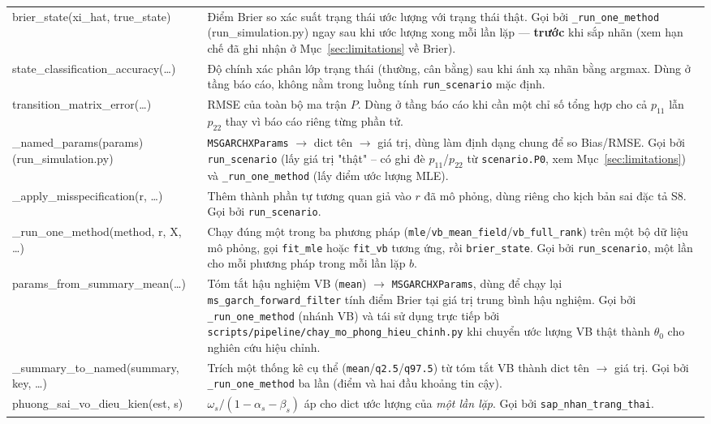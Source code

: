 \documentclass[11pt,a4paper]{article}
\newcommand{\code}[1]{\texttt{#1}}
\begin{document}
\begin{longtable}{@{}>{\ttfamily\scriptsize\raggedright\arraybackslash}p{5.0cm} >{\raggedright\arraybackslash}p{9.5cm}@{}}
brier\_state(xi\_hat, true\_state) & Điểm Brier so xác suất trạng thái ước lượng với trạng thái thật. Gọi bởi \code{\_run\_one\_method} (run\_simulation.py) ngay sau khi ước lượng xong mỗi lần lặp --- \textbf{trước} khi sắp nhãn (xem hạn chế đã ghi nhận ở Mục~\ref{sec:limitations} về Brier). \\
state\_classification\_accuracy(\ldots) & Độ chính xác phân lớp trạng thái (thường, cân bằng) sau khi ánh xạ nhãn bằng argmax. Dùng ở tầng báo cáo, không nằm trong luồng tính \code{run\_scenario} mặc định. \\
transition\_matrix\_error(\ldots) & RMSE của toàn bộ ma trận $P$. Dùng ở tầng báo cáo khi cần một chỉ số tổng hợp cho cả $p_{11}$ lẫn $p_{22}$ thay vì báo cáo riêng từng phần tử. \\
\_named\_params(params) \newline \footnotesize{(run\_simulation.py)} & \code{MSGARCHXParams} $\to$ dict tên $\to$ giá trị, dùng làm định dạng chung để so Bias/RMSE. Gọi bởi \code{run\_scenario} (lấy giá trị "thật" -- có ghi đè $p_{11}$/$p_{22}$ từ \code{scenario.P0}, xem Mục~\ref{sec:limitations}) và \code{\_run\_one\_method} (lấy điểm ước lượng MLE). \\
\_apply\_misspecification(r, \ldots) & Thêm thành phần tự tương quan giả vào $r$ đã mô phỏng, dùng riêng cho kịch bản sai đặc tả S8. Gọi bởi \code{run\_scenario}. \\
\_run\_one\_method(method, r, X, \ldots) & Chạy đúng một trong ba phương pháp (\code{mle}/\code{vb\_mean\_field}/\code{vb\_full\_rank}) trên một bộ dữ liệu mô phỏng, gọi \code{fit\_mle} hoặc \code{fit\_vb} tương ứng, rồi \code{brier\_state}. Gọi bởi \code{run\_scenario}, một lần cho mỗi phương pháp trong mỗi lần lặp $b$. \\
params\_from\_summary\_mean(\ldots) & Tóm tắt hậu nghiệm VB (\code{mean}) $\to$ \code{MSGARCHXParams}, dùng để chạy lại \code{ms\_garch\_forward\_filter} tính điểm Brier tại giá trị trung bình hậu nghiệm. Gọi bởi \code{\_run\_one\_method} (nhánh VB) và tái sử dụng trực tiếp bởi \code{scripts/pipeline/chay\_mo\_phong\_hieu\_chinh.py} khi chuyển ước lượng VB thật thành $\theta_0$ cho nghiên cứu hiệu chỉnh. \\
\_summary\_to\_named(summary, key, \ldots) & Trích một thống kê cụ thể (\code{mean}/\code{q2.5}/\code{q97.5}) từ tóm tắt VB thành dict tên $\to$ giá trị. Gọi bởi \code{\_run\_one\_method} ba lần (điểm và hai đầu khoảng tin cậy). \\
phuong\_sai\_vo\_dieu\_kien(est, s) & $\omega_s/(1-\alpha_s-\beta_s)$ áp cho dict ước lượng của \emph{một lần lặp}. Gọi bởi \code{sap\_nhan\_trang\_thai}. \\

\end{longtable}
\end{document}
